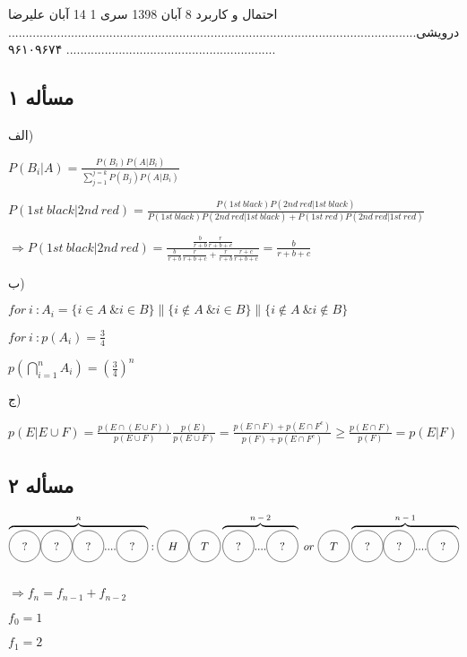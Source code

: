 \documentclass[12pt]{article}
\newcommand*\coin[1]{\tikz[baseline=(char.base)]{
            \node[shape=circle,draw,inner sep=2pt,minimum size=10mm] (char) {#1};}}
\begin{document}
\handout
{احتمال و کاربرد}
{}
{8 آبان 1398}
{سری 1}
{14 آبان}
علیرضا درویشی................................................................................................................................................................................. ۹۶۱۰۹۶۷۴
\subsection*{مسأله ۱}
الف)
\begin{flushleft}
$P(B_i | A)=\frac{P(B_i)P(A|B_i)}{\sum_{j=1}^{j=k}P(B_j)P(A|B_i)}$

$P(1st\ black | 2nd \ red)=\frac{P(1st\ black)P(2nd\ red|1st\ black)}{P(1st\ black)P(2nd\ red|1st\ black)+P(1st\ red)P(2nd\ red|1st\ red)}$

$\Rightarrow P(1st\ black | 2nd \ red)=\frac{\frac{b}{r+b}\frac{r}{r+b+c}}{\frac{b}{r+b}\frac{r}{r+b+c}+\frac{r}{r+b}\frac{r+c}{r+b+c}}=\frac{b}{r+b+c}$


\end{flushleft}
ب)
\begin{flushleft}
$for \ i\ : A_i= \{i\in A\ \& i\in B\} \parallel \{i\notin A\ \& i\in B\} \parallel \{i\notin A\ \& i\notin B\}$

$for \ i\ : p(A_i)=\frac{3}{4}$

$p(\bigcap^n_{i=1}A_i)=(\frac{3}{4})^n$
\end{flushleft}


ج)

\begin{flushleft}
$p(E|E\cup F)=\frac{p(E\cap (E\cup F))}{p(E\cup F)}\frac{p(E)}{p(E\cup F)}=\frac{p(E\cap F)+p(E\cap F^c)}{p(F)+p(E\cap F^c)}\geq \frac{p(E\cap F)}{p(F)}=p(E|F) $



\end{flushleft}

\subsection*{مسأله‌ ۲}
\begin{flushleft}
$\overbrace{\coin{$?$}\coin{$?$}\coin{$?$}....\coin{$?$}}^\text{$n$} : \coin{$H$}\coin{$T$}\overbrace{\coin{$?$}....\coin{$?$}}^\text{$n-2$}\ or\ \coin{$T$}\overbrace{\coin{$?$}\coin{$?$}....\coin{$?$}}^\text{$n-1$}$

$ $

$\Rightarrow f_n=f_{n-1}+f_{n-2}$

$f_0=1$

$f_1=2$

\end{flushleft}
\end{document}
